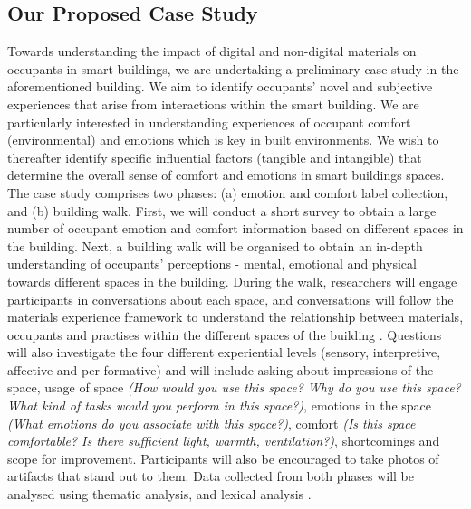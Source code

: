 \documentclass[manuscript, anonymous, review]{acmart}
\begin{document}
\subsection{Our Proposed Case Study} 
Towards understanding the impact of digital and non-digital materials on occupants in smart buildings, we are undertaking a preliminary case study in the aforementioned building. We aim to identify occupants' novel and subjective experiences that arise from interactions within the smart building. We are particularly interested in understanding experiences of occupant comfort (environmental) and emotions \cite{alavi2017comfort} which is key in built environments.  We wish to thereafter identify specific influential factors (tangible and intangible) that determine the overall sense of comfort and emotions in smart buildings spaces. The case study comprises two phases: (a) emotion and comfort label collection, and (b) building walk. First, we will conduct a short survey to obtain a large number of occupant emotion and comfort information based on different spaces in the building. Next, a building walk will be organised to obtain an in-depth understanding of occupants' perceptions - mental, emotional and physical towards different spaces in the building. During the walk, researchers will engage participants in conversations about each space, and conversations will follow the materials experience framework to understand the relationship between materials, occupants and practises within the different spaces of the building \cite{giaccardi2015foundations}. Questions will also investigate the four different experiential levels (sensory, interpretive, affective and per formative) and will include asking about impressions of the space, usage of space \textit{(How would you use this space? Why do you use this space? What kind of tasks would you perform in this space?)}, emotions in the space \textit{(What emotions do you associate with this space?)}, comfort \textit{(Is this space comfortable? Is there sufficient light, warmth, ventilation?)}, shortcomings and scope for improvement. Participants will also be encouraged to take photos of artifacts that stand out to them. Data collected from both phases will be analysed using thematic analysis, and lexical analysis \cite{braun2006using, xue2020mood}. 


\end{document}

